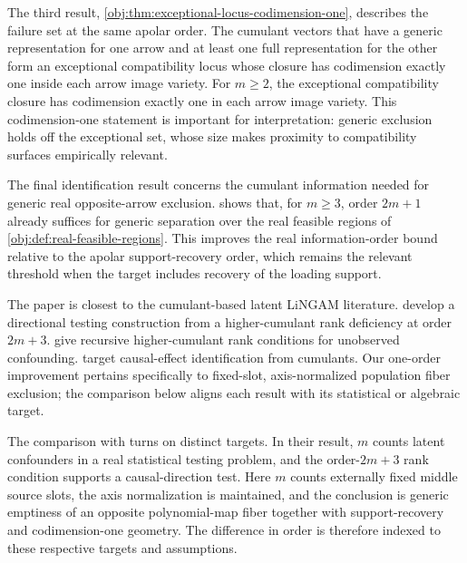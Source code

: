 \documentclass[11pt]{article}
\begin{document}
The third result, \cref{obj:thm:exceptional-locus-codimension-one}, describes the failure set at the same apolar order. The cumulant vectors that have a generic representation for one arrow and at least one full representation for the other form an exceptional compatibility locus whose closure has codimension exactly one inside each arrow image variety. For \(m\ge2\), the exceptional compatibility closure has codimension exactly one in each arrow image variety. This codimension-one statement is important for interpretation: generic exclusion holds off the exceptional set, whose size makes proximity to compatibility surfaces empirically relevant.

The final identification result concerns the cumulant information needed for generic real opposite-arrow exclusion.  shows that, for \(m\ge3\), order \(2m+1\) already suffices for generic separation over the real feasible regions of \cref{obj:def:real-feasible-regions}. This improves the real information-order bound relative to the apolar support-recovery order, which remains the relevant threshold when the target includes recovery of the loading support.

The paper is closest to the cumulant-based latent LiNGAM literature. \citet{ChenPengHuangEtAl2025Direction} develop a directional testing construction from a higher-cumulant rank deficiency at order \(2m+3\). \citet{SchkodaRobevaDrton2024} give recursive higher-cumulant rank conditions for unobserved confounding. \citet{TramontanoKivvaSalehkaleybarDrtonKiyavash2024,TramontanoKivvaSalehkaleybarDrtonKiyavash2025} target causal-effect identification from cumulants. Our one-order improvement pertains specifically to fixed-slot, axis-normalized population fiber exclusion; the comparison below aligns each result with its statistical or algebraic target.

The comparison with \citet{ChenPengHuangEtAl2025Direction} turns on distinct targets. In their result, \(m\) counts latent confounders in a real statistical testing problem, and the order-\(2m+3\) rank condition supports a causal-direction test. Here \(m\) counts externally fixed middle source slots, the axis normalization is maintained, and the conclusion is generic emptiness of an opposite polynomial-map fiber together with support-recovery and codimension-one geometry. The difference in order is therefore indexed to these respective targets and assumptions.
\end{document}
